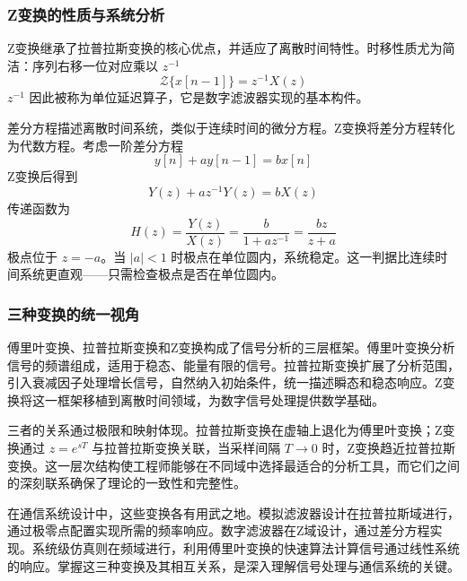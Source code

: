 \subsubsection{Z变换的性质与系统分析}

Z变换继承了拉普拉斯变换的核心优点，并适应了离散时间特性。时移性质尤为简洁：序列右移一位对应乘以 $z^{-1}$
\begin{equation}
    \mathcal{Z}\{x[n-1]\} = z^{-1} X(z)
\end{equation}
$z^{-1}$ 因此被称为单位延迟算子，它是数字滤波器实现的基本构件。

差分方程描述离散时间系统，类似于连续时间的微分方程。Z变换将差分方程转化为代数方程。考虑一阶差分方程
\begin{equation}
    y[n] + a y[n-1] = b x[n]
\end{equation}
Z变换后得到
\begin{equation}
    Y(z) + a z^{-1} Y(z) = b X(z)
\end{equation}
传递函数为
\begin{equation}
    H(z) = \frac{Y(z)}{X(z)} = \frac{b}{1 + a z^{-1}} = \frac{b z}{z + a}
\end{equation}
极点位于 $z = -a$。当 $|a| < 1$ 时极点在单位圆内，系统稳定。这一判据比连续时间系统更直观——只需检查极点是否在单位圆内。

\subsubsection{三种变换的统一视角}

傅里叶变换、拉普拉斯变换和Z变换构成了信号分析的三层框架。傅里叶变换分析信号的频谱组成，适用于稳态、能量有限的信号。拉普拉斯变换扩展了分析范围，引入衰减因子处理增长信号，自然纳入初始条件，统一描述瞬态和稳态响应。Z变换将这一框架移植到离散时间领域，为数字信号处理提供数学基础。

三者的关系通过极限和映射体现。拉普拉斯变换在虚轴上退化为傅里叶变换；Z变换通过 $z = e^{sT}$ 与拉普拉斯变换关联，当采样间隔 $T \to 0$ 时，Z变换趋近拉普拉斯变换。这一层次结构使工程师能够在不同域中选择最适合的分析工具，而它们之间的深刻联系确保了理论的一致性和完整性。

在通信系统设计中，这些变换各有用武之地。模拟滤波器设计在拉普拉斯域进行，通过极零点配置实现所需的频率响应。数字滤波器在Z域设计，通过差分方程实现。系统级仿真则在频域进行，利用傅里叶变换的快速算法计算信号通过线性系统的响应。掌握这三种变换及其相互关系，是深入理解信号处理与通信系统的关键。
